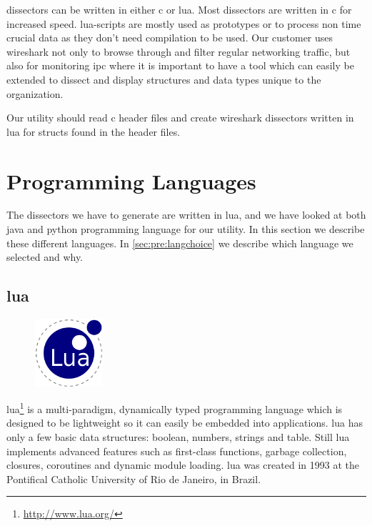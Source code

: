 \Glspl{dissector} can be written in either \Gls{c} or \Gls{lua}. Most \glspl{dissector} are written in \Gls{c}
for increased speed. \Gls{lua}-scripts are mostly used as prototypes or to process
non time crucial data as they don't need compilation to be used. Our customer
uses \Gls{wireshark} not only to browse through and filter regular networking
traffic, but also for monitoring \gls{ipc} where it is
important to have a tool which can easily be extended to dissect and display
structures and data types unique to the organization.

Our \gls{utility} should read \Gls{c} \gls{header} files and create \Gls{wireshark} \glspl{dissector} written
in \Gls{lua} for \glspl{struct} found in the \gls{header} files.


\section{Programming Languages}
\label{sec:pre:langs}
The \glspl{dissector} we have to generate are written in \Gls{lua}, and we have looked at
both \Gls{java} and \Gls{python} programming language for our \gls{utility}. In this section we
describe these different languages. In \autoref{sec:pre:langchoice} we describe
which language we selected and why.

\subsection{\Gls{lua}}
\begin{figure}
	\vspace{-10pt}
	\includegraphics[width=2.5cm]{./planning/img/lua_logo}
	\vspace{-20pt}
\end{figure}
\Gls{lua}\footnote{\url{http://www.lua.org/}} is a multi-paradigm, dynamically typed
programming language which is designed to be lightweight so it can easily be
embedded into applications. \Gls{lua} has only a few basic data structures: boolean,
numbers, strings and table. Still \Gls{lua} implements advanced features such as
first-class functions, garbage collection, closures, coroutines and dynamic
module loading. \Gls{lua} was created in 1993 at the Pontifical Catholic University
of Rio de Janeiro, in Brazil.\cite{LuaORG}


